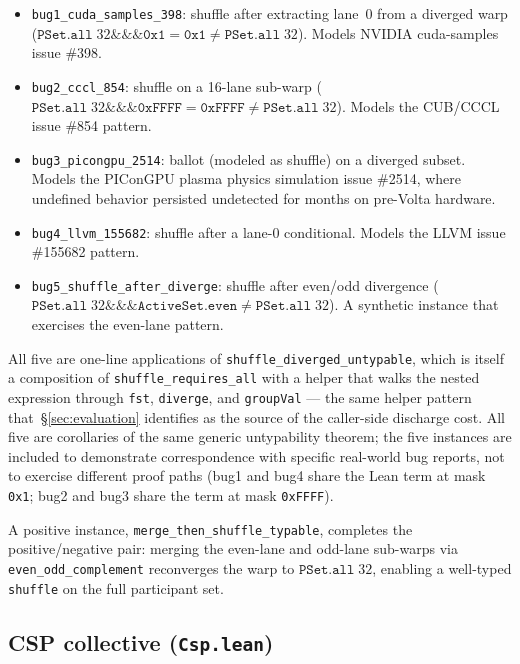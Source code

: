 \documentclass[acmsmall,screen,review,anonymous,nonacm]{acmart}
\begin{document}
\begin{itemize}
  \item \texttt{bug1\_cuda\_samples\_398}: shuffle after extracting lane~0 from a diverged warp ($\texttt{PSet.all}\;32 \mathbin{\&\&\&} \texttt{0x1} = \texttt{0x1} \neq \texttt{PSet.all}\;32$). Models NVIDIA cuda-samples issue \#398.
  \item \texttt{bug2\_cccl\_854}: shuffle on a 16-lane sub-warp ($\texttt{PSet.all}\;32 \mathbin{\&\&\&} \texttt{0xFFFF} = \texttt{0xFFFF} \neq \texttt{PSet.all}\;32$). Models the CUB/CCCL issue \#854 pattern.
  \item \texttt{bug3\_picongpu\_2514}: ballot (modeled as shuffle) on a diverged subset. Models the PIConGPU plasma physics simulation issue \#2514, where undefined behavior persisted undetected for months on pre-Volta hardware.
  \item \texttt{bug4\_llvm\_155682}: shuffle after a lane-0 conditional. Models the LLVM issue \#155682 pattern.
  \item \texttt{bug5\_shuffle\_after\_diverge}: shuffle after even/odd divergence ($\texttt{PSet.all}\;32 \mathbin{\&\&\&} \texttt{ActiveSet.even} \neq \texttt{PSet.all}\;32$). A synthetic instance that exercises the even-lane pattern.
\end{itemize}

All five are one-line applications of \texttt{shuffle\_diverged\_untypable}, which is itself a composition of \texttt{shuffle\_requires\_all} with a helper that walks the nested expression through \texttt{fst}, \texttt{diverge}, and \texttt{groupVal} --- the same helper pattern that~\S\ref{sec:evaluation} identifies as the source of the caller-side discharge cost. All five are corollaries of the same generic untypability theorem; the five instances are included to demonstrate correspondence with specific real-world bug reports, not to exercise different proof paths (bug1 and bug4 share the Lean term at mask \texttt{0x1}; bug2 and bug3 share the term at mask \texttt{0xFFFF}).

A positive instance, \texttt{merge\_then\_shuffle\_typable}, completes the positive/negative pair: merging the even-lane and odd-lane sub-warps via \texttt{even\_odd\_complement} reconverges the warp to $\texttt{PSet.all}\;32$, enabling a well-typed \texttt{shuffle} on the full participant set.

\subsection{CSP collective (\texttt{Csp.lean})}\label{sec:csp-collective}
\end{document}
